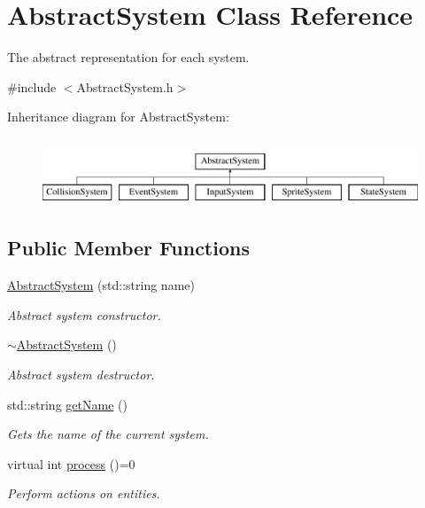 \hypertarget{class_abstract_system}{\section{Abstract\-System Class Reference}
\label{d0/d74/class_abstract_system}
}


The abstract representation for each system.  




{\ttfamily \#include $<$Abstract\-System.\-h$>$}

Inheritance diagram for Abstract\-System\-:\begin{figure}[H]
\begin{center}
\leavevmode
\includegraphics[height=2.000000cm]{d0/d74/class_abstract_system}
\end{center}
\end{figure}
\subsection*{Public Member Functions}
\begin{DoxyCompactItemize}
\item 
\hypertarget{class_abstract_system_aa298e56d5a792e662f83a28b9a38ff6b}{\hyperlink{class_abstract_system_aa298e56d5a792e662f83a28b9a38ff6b}{Abstract\-System} (std\-::string name)}\label{d0/d74/class_abstract_system_aa298e56d5a792e662f83a28b9a38ff6b}

\begin{DoxyCompactList}\small\item\em Abstract system constructor. \end{DoxyCompactList}\item 
\hypertarget{class_abstract_system_a8a4574ecd1919c480927dbeeb24bc754}{\hyperlink{class_abstract_system_a8a4574ecd1919c480927dbeeb24bc754}{$\sim$\-Abstract\-System} ()}\label{d0/d74/class_abstract_system_a8a4574ecd1919c480927dbeeb24bc754}

\begin{DoxyCompactList}\small\item\em Abstract system destructor. \end{DoxyCompactList}\item 
std\-::string \hyperlink{class_abstract_system_a82b244568fe057bf557e898510ecc97d}{get\-Name} ()
\begin{DoxyCompactList}\small\item\em Gets the name of the current system. \end{DoxyCompactList}\item 
virtual int \hyperlink{class_abstract_system_af8bfe74feb5df2b5e3fff67bfe1106b9}{process} ()=0
\begin{DoxyCompactList}\small\item\em Perform actions on entities. \end{DoxyCompactList}\end{DoxyCompactItemize}

